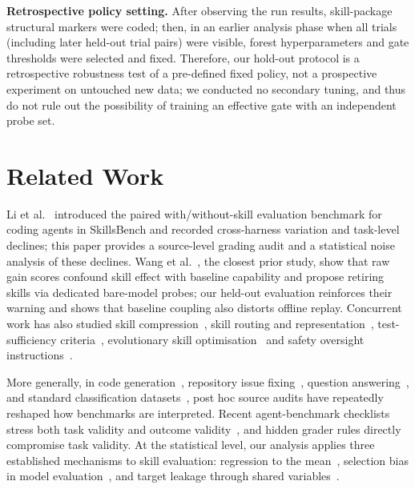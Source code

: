 \documentclass[10pt,conference]{IEEEtran}
\begin{document}
\textbf{Retrospective policy setting.} After observing the run results, skill-package structural markers were coded; then, in an earlier analysis phase when all trials (including later held-out trial pairs) were visible, forest hyperparameters and gate thresholds were selected and fixed. Therefore, our hold-out protocol is a retrospective robustness test of a pre-defined fixed policy, not a prospective experiment on untouched new data; we conducted no secondary tuning, and thus do not rule out the possibility of training an effective gate with an independent probe set.

\section{Related Work}
Li et al.~\cite{li2026skillsbench} introduced the paired with/without-skill evaluation benchmark for coding agents in SkillsBench and recorded cross-harness variation and task-level declines; this paper provides a source-level grading audit and a statistical noise analysis of these declines. Wang et al.~\cite{wang2026beyondgain}, the closest prior study, show that raw gain scores confound skill effect with baseline capability and propose retiring skills via dedicated bare-model probes; our held-out evaluation reinforces their warning and shows that baseline coupling also distorts offline replay. Concurrent work has also studied skill compression~\cite{gao2026skillreducer}, skill routing and representation~\cite{liu2026implicitrouting,sun2026skillrep}, test-sufficiency criteria~\cite{tan2026skillcoverage}, evolutionary skill optimisation~\cite{ma2026skillneo} and safety oversight instructions~\cite{sanko2026oversight}.

More generally, in code generation~\cite{liu2023evalplus}, repository issue fixing~\cite{jimenez2024swebench,chowdhury2024swebenchverified}, question answering~\cite{gema2025mmluredux}, and standard classification datasets~\cite{northcutt2021pervasive}, post hoc source audits have repeatedly reshaped how benchmarks are interpreted. Recent agent-benchmark checklists stress both task validity and outcome validity~\cite{kapoor2024agents,zhu2025abc}, and hidden grader rules directly compromise task validity. At the statistical level, our analysis applies three established mechanisms to skill evaluation: regression to the mean~\cite{barnett2005regression}, selection bias in model evaluation~\cite{cawley2010overfitting}, and target leakage through shared variables~\cite{kapoor2022leakage}.
\end{document}
